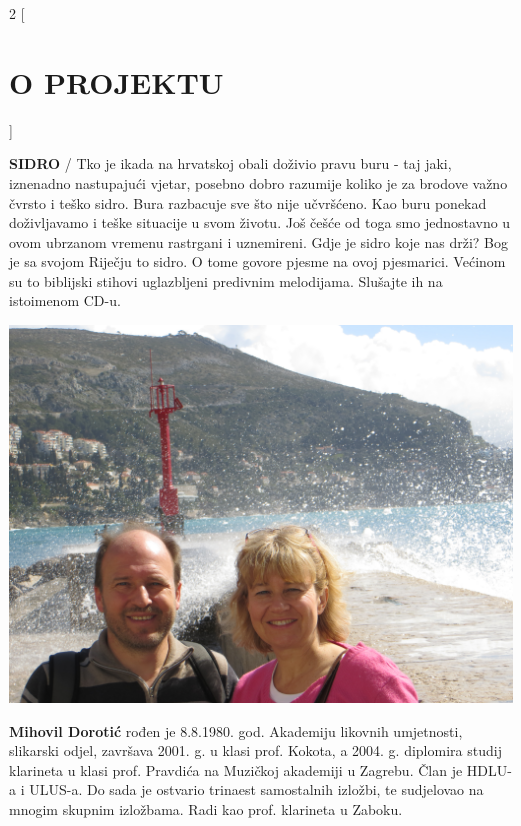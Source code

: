 \documentclass[a4paper,twoside, svgnames]{article}
\begin{document}
\newpage
\begin{multicols}{2}
[
\section*{O PROJEKTU}
]
    \begin{onehalfspacing}
        \begin{justify}
\textbf{SIDRO} / Tko je ikada na hrvatskoj obali doživio pravu buru -  taj jaki, iznenadno nastupajući vjetar, posebno dobro razumije koliko je za brodove važno čvrsto i teško sidro. Bura razbacuje sve što nije učvršćeno. Kao buru ponekad doživljavamo i teške situacije  u svom životu. Još češće od toga smo jednostavno u ovom ubrzanom vremenu rastrgani i uznemireni.
Gdje je sidro koje nas drži?
Bog je sa svojom Riječju  to sidro. O tome govore pjesme na ovoj pjesmarici. Većinom su to  biblijski stihovi uglazbljeni predivnim melodijama. Slušajte ih na istoimenom CD-u.

\begin{center}
\includegraphics[width=\linewidth]{images/IMG_1216}
\end{center}
\textbf{Mihovil Dorotić} rođen je 8.8.1980. god. Akademiju likovnih umjetnosti, slikarski odjel, završava 2001. g. u klasi prof. Kokota, a 2004. g. diplomira studij klarineta u klasi prof. Pravdića  na Muzičkoj akademiji u Zagrebu. Član je HDLU-a i ULUS-a. Do sada je ostvario trinaest samostalnih izložbi, te sudjelovao na mnogim skupnim izložbama. Radi kao prof. klarineta u Zaboku.


\end{justify}
\end{onehalfspacing}
\end{multicols}
\end{document}
